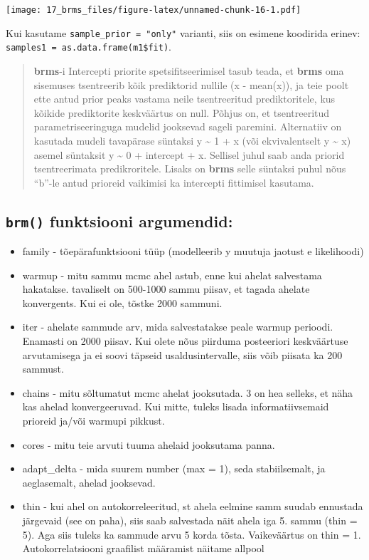 \documentclass[]{book}
\begin{document}
\texttt{[image: 17\_brms\_files/figure-latex/unnamed-chunk-16-1.pdf]}

Kui kasutame \texttt{sample\_prior\ =\ "only"} varianti, siis on esimene
koodirida erinev: \texttt{samples1\ =\ as.data.frame(m1\$fit)}.

\begin{quote}
\textbf{brms}-i Intercepti priorite spetsifitseerimisel tasub teada, et
\textbf{brms} oma sisemuses tsentreerib kõik prediktorid nullile (x -
mean(x)), ja teie poolt ette antud prior peaks vastama neile
tsentreeritud prediktoritele, kus kõikide prediktorite keskväärtus on
null. Põhjus on, et tsentreeritud parametriseeringuga mudelid jooksevad
sageli paremini. Alternatiiv on kasutada mudeli tavapärase süntaksi y
\textasciitilde{} 1 + x (või ekvivalentselt y \textasciitilde{} x)
asemel süntaksit y \textasciitilde{} 0 + intercept + x. Sellisel juhul
saab anda priorid tsentreerimata predikroritele. Lisaks on \textbf{brms}
selle süntaksi puhul nõus ``b''-le antud prioreid vaikimisi ka
intercepti fittimisel kasutama.
\end{quote}

\subsection{\texorpdfstring{\texttt{brm()} funktsiooni
argumendid:}{brm() funktsiooni argumendid:}}\label{brm-funktsiooni-argumendid}

\begin{itemize}
\item
  family - tõepärafunktsiooni tüüp (modelleerib y muutuja jaotust e
  likelihoodi)
\item
  warmup - mitu sammu mcmc ahel astub, enne kui ahelat salvestama
  hakatakse. tavaliselt on 500-1000 sammu piisav, et tagada ahelate
  konvergents. Kui ei ole, tõstke 2000 sammuni.
\item
  iter - ahelate sammude arv, mida salvestatakse peale warmup perioodi.
  Enamasti on 2000 piisav. Kui olete nõus piirduma posteeriori
  keskväärtuse arvutamisega ja ei soovi täpseid usaldusintervalle, siis
  võib piisata ka 200 sammust.
\item
  chains - mitu sõltumatut mcmc ahelat jooksutada. 3 on hea selleks, et
  näha kas ahelad konvergeeruvad. Kui mitte, tuleks lisada
  informatiivsemaid prioreid ja/või warmupi pikkust.
\item
  cores - mitu teie arvuti tuuma ahelaid jooksutama panna.
\item
  adapt\_delta - mida suurem number (max = 1), seda stabiilsemalt, ja
  aeglasemalt, ahelad jooksevad.
\item
  thin - kui ahel on autokorreleeritud, st ahela eelmine samm suudab
  ennustada järgevaid (see on paha), siis saab salvestada näit ahela iga
  5. sammu (thin = 5). Aga siis tuleks ka sammude arvu 5 korda tõsta.
  Vaikeväärtus on thin = 1. Autokorrelatsiooni graafilist määramist
  näitame allpool
\end{itemize}
\end{document}
